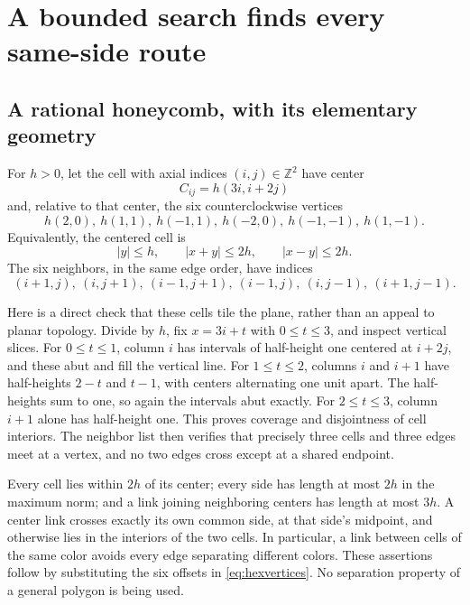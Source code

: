 \section{A bounded search finds every same-side route}\label{sec:connection}

\subsection{A rational honeycomb, with its elementary geometry}

For $h>0$, let the cell with axial indices $(i,j)\in\mathbb Z^2$
have center
\begin{equation}
 C_{ij}=h(3i,i+2j)
 \label{eq:centers}
\end{equation}
and, relative to that center, the six counterclockwise vertices
\begin{equation}
 h(2,0),\ h(1,1),\ h(-1,1),\
 h(-2,0),\ h(-1,-1),\ h(1,-1).
 \label{eq:hexvertices}
\end{equation}
Equivalently, the centered cell is
\[
 |y|\le h,\qquad |x+y|\le2h,\qquad |x-y|\le2h.
\]
The six neighbors, in the same edge order, have indices
\[
 (i+1,j),\ (i,j+1),\ (i-1,j+1),\
 (i-1,j),\ (i,j-1),\ (i+1,j-1).
\]

Here is a direct check that these cells tile the plane, rather than an
appeal to planar topology. Divide by $h$, fix $x=3i+t$ with
$0\le t\le3$, and inspect vertical slices.
For $0\le t\le1$, column $i$ has intervals of half-height one
centered at $i+2j$, and these abut and fill the vertical line.
For $1\le t\le2$, columns $i$ and $i+1$ have half-heights
$2-t$ and $t-1$, with centers alternating one unit apart.
The half-heights sum to one, so again the intervals abut exactly.
For $2\le t\le3$, column $i+1$ alone has half-height one.
This proves coverage and disjointness of cell interiors.
The neighbor list then verifies that precisely three cells and
three edges meet at a vertex, and no two edges cross except at
a shared endpoint.

Every cell lies within $2h$ of its center; every side has length at
most $2h$ in the maximum norm; and a link joining neighboring centers
has length at most $3h$. A center link crosses exactly its own common
side, at that side's midpoint, and otherwise lies in the interiors
of the two cells. In particular, a link between cells of the same
color avoids every edge separating different colors. These assertions
follow by substituting the six offsets in
\eqref{eq:hexvertices}. No separation property of a general polygon
is being used.

